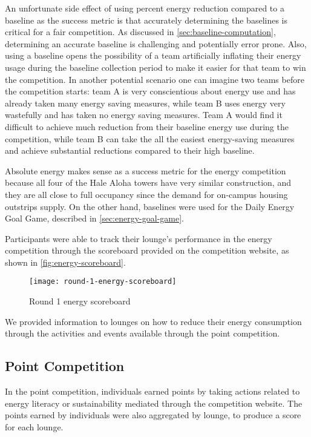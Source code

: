 An unfortunate side effect of using percent energy reduction compared to a baseline as the success metric is that accurately determining the baselines is critical for a fair competition. As discussed in \autoref{sec:baseline-computation}, determining an accurate baseline is challenging and potentially error prone. Also, using a baseline opens the possibility of a team artificially inflating their energy usage during the baseline collection period to make it easier for that team to win the competition. In another potential scenario one can imagine two teams before the competition starts: team A is very conscientious about energy use and has already taken many energy saving measures, while team B uses energy very wastefully and has taken no energy saving measures. Team A would find it difficult to achieve much reduction from their baseline energy use during the competition, while team B can take the all the easiest energy-saving measures and achieve substantial reductions compared to their high baseline.

Absolute energy makes sense as a success metric for the energy competition because all four of the Hale Aloha towers have very similar construction, and they are all close to full occupancy since the demand for on-campus housing outstrips supply. On the other hand, baselines were used for the Daily Energy Goal Game, described in \autoref{sec:energy-goal-game}.

Participants were able to track their lounge's performance in the energy competition through the scoreboard provided on the competition website, as shown in \autoref{fig:energy-scoreboard}.

\begin{figure}[htbp]
	\centering
		\texttt{[image: round-1-energy-scoreboard]}
		\caption{Round 1 energy scoreboard}
\label{fig:energy-scoreboard}
\end{figure}

We provided information to lounges on how to reduce their energy consumption through the activities and events available through the point competition.


\subsection{Point Competition}
\label{sec:point-competition}

In the point competition, individuals earned points by taking actions related to energy literacy or sustainability mediated through the competition website. The points earned by individuals were also aggregated by lounge, to produce a score for each lounge.

